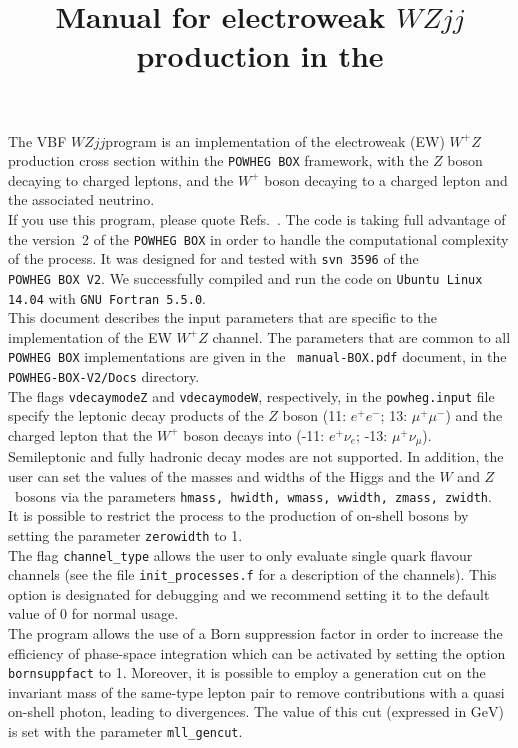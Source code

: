 \documentclass[a4paper,11pt]{article}
\title{Manual for electroweak $WZ jj$ production in the \POWHEGBOXV{}}
\date{}
\newcommand\POWHEGBOX{{\tt POWHEG~BOX}}
\newcommand\POWHEGBOXV{{\tt POWHEG~BOX~V2}}
\def\vbfwz{VBF $WZjj$\;}
\def\wpz{W^+Z}
\def\pbox{{\tt POWHEG BOX}}
\begin{document}
\maketitle
%
\noindent
The \vbfwz program is an implementation of the electroweak
(EW) 
$\wpz$ production cross section within the \pbox{} framework, with the $Z$ boson decaying to charged leptons, and the $W^+$ boson decaying to a charged lepton and the associated neutrino. 
\\[2ex]
If you use this program, please quote
Refs.~\cite{Bozzi:2007ur,JKS,Alioli:2010xd}. The code is taking full
advantage of the version~2 of the \POWHEGBOX{} in order to handle the
computational complexity of the process. It was designed for and tested with \texttt{svn 3596} of the \POWHEGBOXV. We successfully compiled and run the code on \texttt{Ubuntu Linux 14.04} with \texttt{GNU Fortran 5.5.0}.
\\[2ex]
This document describes the input parameters that are specific to the
implementation of the EW $\wpz$ channel.  The parameters that are
common to all {\tt POWHEG BOX} implementations are given in the {\tt
  manual-BOX.pdf} document, in the {\tt POWHEG-BOX-V2/Docs} directory.
\\[2ex]
The flags {\tt vdecaymodeZ} and {\tt vdecaymodeW},
respectively, in the {\tt powheg.input} file specify the leptonic decay products of the $Z$ boson
(11: $e^+e^-$; 13: $\mu^+\mu^-$) and the charged lepton that the $W^+$ boson decays into (-11: $e^+\nu_e$; -13: $\mu^+\nu_\mu$). Semileptonic and fully hadronic decay modes are not supported. 
In addition, the user can set the values of the masses and widths of
the Higgs and the $W$ and $Z$~bosons via the parameters {\tt hmass, hwidth,
  wmass, wwidth,   zmass, zwidth}.
\\[2ex]
It is possible to restrict the process to the production of on-shell bosons by setting the parameter {\tt zerowidth} to 1.
\\[2ex]
The flag {\tt channel\_type} allows the user to only evaluate single quark flavour channels (see the file \texttt{init\_processes.f} for a description of the channels). This option is designated for debugging and we recommend setting it to the default value of 0 for normal usage.
\\[2ex]
The program allows the use of a Born suppression factor in order to increase the efficiency of phase-space integration which can be activated by setting the option \texttt{bornsuppfact} to 1. Moreover, it is possible to employ a generation cut on the invariant mass of the same-type lepton pair to remove contributions with a quasi on-shell photon, leading to divergences. The value of this cut (expressed in $\text{GeV}$) is set with the parameter \texttt{mll\_gencut}.
\end{document}
